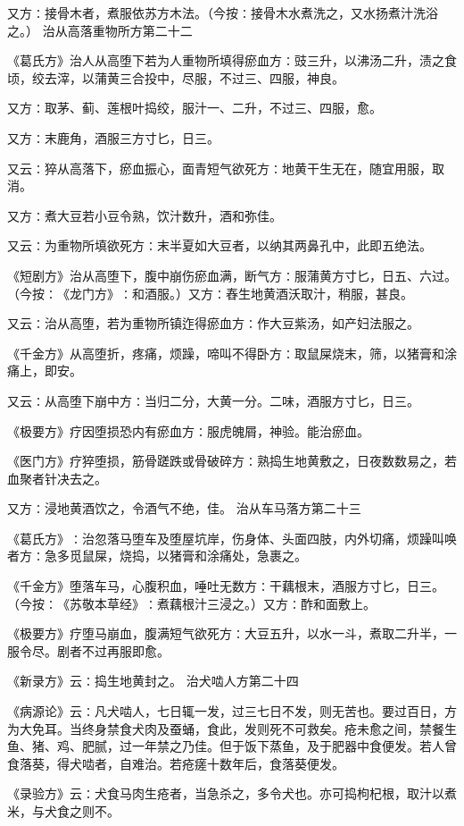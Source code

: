 \documentclass[a4paper,12pt,UTF8,twoside]{ctexbook}
\begin{document}
又方∶接骨木者，煮服依苏方木法。（今按∶接骨木水煮洗之，又水扬煮汁洗浴之。）
治从高落重物所方第二十二

《葛氏方》治人从高堕下若为人重物所填得瘀血方∶豉三升，以沸汤二升，渍之食顷，绞去滓，以蒲黄三合投中，尽服，不过三、四服，神良。

又方∶取茅、蓟、莲根叶捣绞，服汁一、二升，不过三、四服，愈。

又方∶末鹿角，酒服三方寸匕，日三。

又云∶猝从高落下，瘀血振心，面青短气欲死方∶地黄干生无在，随宜用服，取消。

又方∶煮大豆若小豆令熟，饮汁数升，酒和弥佳。

又云∶为重物所填欲死方∶末半夏如大豆者，以纳其两鼻孔中，此即五绝法。

《短剧方》治从高堕下，腹中崩伤瘀血满，断气方∶服蒲黄方寸匕，日五、六过。（今按∶《龙门方》∶和酒服。）又方∶舂生地黄酒沃取汁，稍服，甚良。

又云∶治从高堕，若为重物所镇迮得瘀血方∶作大豆紫汤，如产妇法服之。

《千金方》从高堕折，疼痛，烦躁，啼叫不得卧方∶取鼠屎烧末，筛，以猪膏和涂痛上，即安。

又云∶从高堕下崩中方∶当归二分，大黄一分。二味，酒服方寸匕，日三。

《极要方》疗因堕损恐内有瘀血方∶服虎魄屑，神验。能治瘀血。

《医门方》疗猝堕损，筋骨蹉跌或骨破碎方∶熟捣生地黄敷之，日夜数数易之，若血聚者针决去之。

又方∶浸地黄酒饮之，令酒气不绝，佳。
治从车马落方第二十三

《葛氏方》∶治忽落马堕车及堕屋坑岸，伤身体、头面四肢，内外切痛，烦躁叫唤者方∶急多觅鼠屎，烧捣，以猪膏和涂痛处，急裹之。

《千金方》堕落车马，心腹积血，唾吐无数方∶干藕根末，酒服方寸匕，日三。（今按∶《苏敬本草经》∶煮藕根汁三浸之。）又方∶酢和面敷上。

《极要方》疗堕马崩血，腹满短气欲死方∶大豆五升，以水一斗，煮取二升半，一服令尽。剧者不过再服即愈。

《新录方》云∶捣生地黄封之。
治犬啮人方第二十四

《病源论》云∶凡犬啮人，七日辄一发，过三七日不发，则无苦也。要过百日，方为大免耳。当终身禁食犬肉及蚕蛹，食此，发则死不可救矣。疮未愈之间，禁餐生鱼、猪、鸡、肥腻，过一年禁之乃佳。但于饭下蒸鱼，及于肥器中食便发。若人曾食落葵，得犬啮者，自难治。若疮瘥十数年后，食落葵便发。

《录验方》云∶犬食马肉生疮者，当急杀之，多令犬也。亦可捣枸杞根，取汁以煮米，与犬食之则不。
\end{document}
